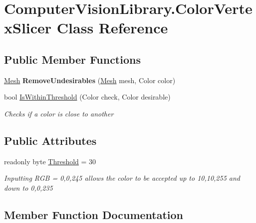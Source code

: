 \hypertarget{class_computer_vision_library_1_1_color_vertex_slicer}{}\section{Computer\+Vision\+Library.\+Color\+Vertex\+Slicer Class Reference}
\label{class_computer_vision_library_1_1_color_vertex_slicer}
\subsection*{Public Member Functions}
\begin{DoxyCompactItemize}
\item 
\hypertarget{class_computer_vision_library_1_1_color_vertex_slicer_a56f877bf8c9dd7e30346b26d96527e65}{}\label{class_computer_vision_library_1_1_color_vertex_slicer_a56f877bf8c9dd7e30346b26d96527e65} 
\hyperlink{class_computer_vision_library_1_1_mesh}{Mesh} {\bfseries Remove\+Undesirables} (\hyperlink{class_computer_vision_library_1_1_mesh}{Mesh} mesh, Color color)
\item 
bool \hyperlink{class_computer_vision_library_1_1_color_vertex_slicer_a0c9a976faaff5db5d7a5aa5c8bc5f1f7}{Is\+Within\+Threshold} (Color check, Color desirable)
\begin{DoxyCompactList}\small\item\em Checks if a color is close to another \end{DoxyCompactList}\end{DoxyCompactItemize}
\subsection*{Public Attributes}
\begin{DoxyCompactItemize}
\item 
readonly byte \hyperlink{class_computer_vision_library_1_1_color_vertex_slicer_a7313d6cee1d46433875b7aa61ec1d36e}{Threshold} = 30
\begin{DoxyCompactList}\small\item\em Inputting R\+GB = 0,0,245 allows the color to be accepted up to 10,10,255 and down to 0,0,235 \end{DoxyCompactList}\end{DoxyCompactItemize}


\subsection{Member Function Documentation}
\hypertarget{class_computer_vision_library_1_1_color_vertex_slicer_a0c9a976faaff5db5d7a5aa5c8bc5f1f7}{}\label{class_computer_vision_library_1_1_color_vertex_slicer_a0c9a976faaff5db5d7a5aa5c8bc5f1f7} 
